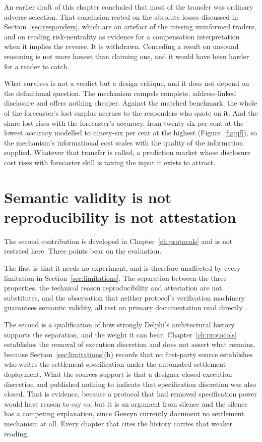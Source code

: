 An earlier draft of this chapter concluded that most of the transfer was ordinary adverse
selection. That conclusion rested on the absolute losses discussed in
Section~\ref{sec:responders}, which are an artefact of the missing uninformed traders, and
on reading risk-neutrality as evidence for a compensation interpretation when it implies the
reverse. It is withdrawn. Conceding a result on unsound reasoning is not more honest than
claiming one, and it would have been harder for a reader to catch.

What survives is not a verdict but a design critique, and it does not depend on the
definitional question. The mechanism compels complete, address-linked disclosure and offers
nothing cheaper. Against the matched benchmark, the whole of the forecaster's lost surplus
accrues to the responders who quote on it. And the share lost rises with the
forecaster's accuracy, from twenty-six per cent at the lowest accuracy modelled to
ninety-six per cent at the highest (Figure~\ref{fig:qf}), so the mechanism's informational
cost scales with the quality of the information supplied. Whatever that transfer is called,
a prediction market whose disclosure cost rises with forecaster skill is taxing the input it
exists to attract.

\section{Semantic validity is not reproducibility is not attestation}
\label{sec:threelayer-eval}

The second contribution is developed in Chapter~\ref{ch:protocols} and is not restated here.
Three points bear on the evaluation.

The first is that it needs no experiment, and is therefore unaffected by every limitation in
Section~\ref{sec:limitations}. The separation between the three properties, the technical
reason reproducibility and attestation are not substitutes, and the observation that neither
protocol's verification machinery guarantees semantic validity, all rest on primary
documentation read directly
\cite{gensyn2026receipts,truebit2026orchestration,uma2026oracle}.

The second is a qualification of how strongly Delphi's architectural history supports the
separation, and the weight it can bear. Chapter~\ref{ch:protocols} establishes the removal
of execution discretion and does not assert what remains, because
Section~\ref{sec:limitations}(h) records that no first-party source establishes who writes
the settlement specification under the automated-settlement deployment. What the sources
support is that a designer closed execution discretion and published nothing to indicate
that specification discretion was also closed. That is evidence, because a protocol that had
removed specification power would have reason to say so, but it is an argument from silence
and the silence has a competing explanation, since Gensyn currently document no settlement
mechanism at all. Every chapter that cites the history carries that weaker reading.

